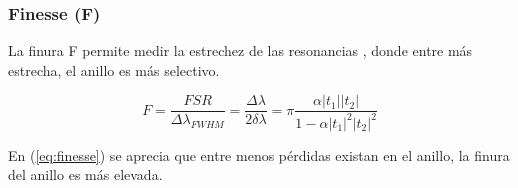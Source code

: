 \subsubsection{Finesse (F)}

La finura F permite medir la estrechez de las resonancias \cite{blasco2011desarrollo},
donde entre más estrecha, el anillo es más selectivo.

\begin{equation}
F=\frac{FSR}{\Delta \lambda_{FWHM}}
 =\frac{\Delta \lambda}{2 \delta \lambda} 
 = \pi \frac{\alpha|t_1||t_2|}{1-\alpha|t_1|^2|t_2|^2}
\label{eq:finesse}
\end{equation} 

En (\ref{eq:finesse}) se aprecia que entre menos pérdidas existan en el anillo, 
la finura del anillo es más elevada.

 
